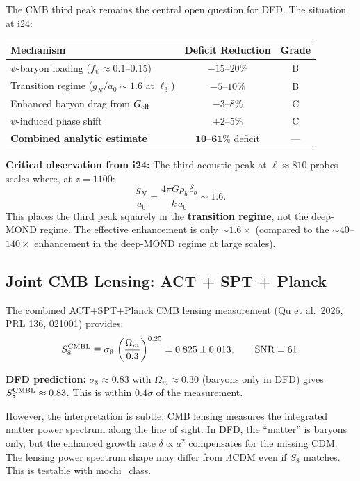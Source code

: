 \documentclass[11pt]{article}
\newcommand{\LCDM}{$\Lambda$CDM}
\newcommand{\Geff}{G_{\rm eff}}
\newcommand{\aM}{a_0}
\newcommand{\Om}{\Omega_m}
\begin{document}
The CMB third peak remains the central open question for DFD.
The situation at i24:

\begin{center}
\begin{tabular}{lcc}
\toprule
\textbf{Mechanism} & \textbf{Deficit Reduction} & \textbf{Grade} \\
\midrule
$\psi$-baryon loading ($f_\psi \approx 0.1$--0.15) & $-15$--$20\%$ & B \\
Transition regime ($g_N/\aM \sim 1.6$ at $\ell_3$) & $-5$--$10\%$ & B \\
Enhanced baryon drag from $\Geff$ & $-3$--$8\%$ & C \\
$\psi$-induced phase shift & $\pm 2$--$5\%$ & C \\
\midrule
\textbf{Combined analytic estimate} & $\mathbf{10}$--$\mathbf{61\%}$ deficit & --- \\
\bottomrule
\end{tabular}
\end{center}

\textbf{Critical observation from i24:} The third acoustic peak at
$\ell \approx 810$ probes scales where, at $z = 1100$:
\begin{equation}
  \frac{g_N}{\aM} = \frac{4\pi G\rho_b\,\delta_b}{k\,\aM} \sim 1.6.
\end{equation}
This places the third peak squarely in the \textbf{transition regime},
not the deep-MOND regime. The effective enhancement is only $\sim 1.6\times$
(compared to the $\sim 40$--$140\times$ enhancement in the deep-MOND regime
at large scales).

\subsection{Joint CMB Lensing: ACT + SPT + Planck}

The combined ACT+SPT+Planck CMB lensing measurement (Qu et al.\ 2026,
PRL 136, 021001) provides:
\begin{equation}
  S_8^{\rm CMBL} \equiv \sigma_8\,\left(\frac{\Om}{0.3}\right)^{0.25}
  = 0.825 \pm 0.013, \qquad \text{SNR} = 61.
\end{equation}

\textbf{DFD prediction:} $\sigma_8 \approx 0.83$ with $\Om \approx 0.30$
(baryons only in DFD) gives $S_8^{\rm CMBL} \approx 0.83$. This is
within $0.4\sigma$ of the measurement.

However, the interpretation is subtle: CMB lensing measures the integrated
matter power spectrum along the line of sight. In DFD, the ``matter'' is
baryons only, but the enhanced growth rate $\delta \propto a^2$ compensates
for the missing CDM. The lensing power spectrum shape may differ from
\LCDM{} even if $S_8$ matches. This is testable with mochi\_class.
\end{document}
